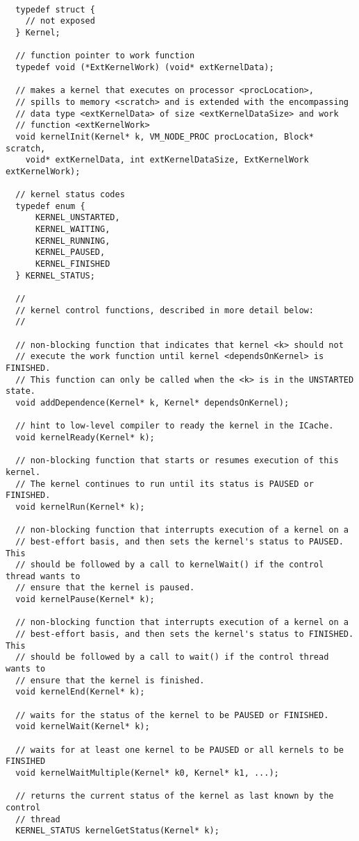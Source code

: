 {\small
\begin{verbatim}

  typedef struct {
    // not exposed
  } Kernel;

  // function pointer to work function
  typedef void (*ExtKernelWork) (void* extKernelData);

  // makes a kernel that executes on processor <procLocation>,
  // spills to memory <scratch> and is extended with the encompassing
  // data type <extKernelData> of size <extKernelDataSize> and work
  // function <extKernelWork>
  void kernelInit(Kernel* k, VM_NODE_PROC procLocation, Block* scratch,
    void* extKernelData, int extKernelDataSize, ExtKernelWork extKernelWork);

  // kernel status codes
  typedef enum {
      KERNEL_UNSTARTED,
      KERNEL_WAITING,
      KERNEL_RUNNING,
      KERNEL_PAUSED,
      KERNEL_FINISHED
  } KERNEL_STATUS;

  //
  // kernel control functions, described in more detail below:
  //

  // non-blocking function that indicates that kernel <k> should not 
  // execute the work function until kernel <dependsOnKernel> is FINISHED.  
  // This function can only be called when the <k> is in the UNSTARTED state.
  void addDependence(Kernel* k, Kernel* dependsOnKernel);

  // hint to low-level compiler to ready the kernel in the ICache.
  void kernelReady(Kernel* k);

  // non-blocking function that starts or resumes execution of this kernel. 
  // The kernel continues to run until its status is PAUSED or FINISHED.
  void kernelRun(Kernel* k);

  // non-blocking function that interrupts execution of a kernel on a
  // best-effort basis, and then sets the kernel's status to PAUSED.  This 
  // should be followed by a call to kernelWait() if the control thread wants to
  // ensure that the kernel is paused.
  void kernelPause(Kernel* k);

  // non-blocking function that interrupts execution of a kernel on a 
  // best-effort basis, and then sets the kernel's status to FINISHED.  This 
  // should be followed by a call to wait() if the control thread wants to 
  // ensure that the kernel is finished.
  void kernelEnd(Kernel* k);

  // waits for the status of the kernel to be PAUSED or FINISHED.
  void kernelWait(Kernel* k);

  // waits for at least one kernel to be PAUSED or all kernels to be FINSIHED
  void kernelWaitMultiple(Kernel* k0, Kernel* k1, ...);

  // returns the current status of the kernel as last known by the control
  // thread
  KERNEL_STATUS kernelGetStatus(Kernel* k);
\end{verbatim}}

